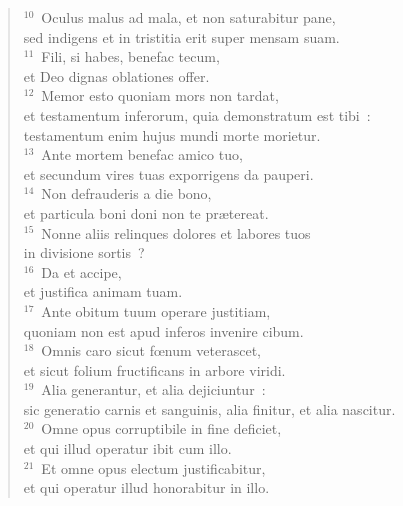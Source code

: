 \begin{flushleft}
\begin{verse}
${}^{10}$~Oculus malus ad mala, et non saturabitur pane,\\ sed indigens et in tristitia erit super mensam suam.\\
${}^{11}$~Fili, si habes, benefac tecum,\\ et Deo dignas oblationes offer.\\
${}^{12}$~Memor esto quoniam mors non tardat,\\ et testamentum inferorum, quia demonstratum est tibi~:\\ testamentum enim hujus mundi morte morietur.\\
${}^{13}$~Ante mortem benefac amico tuo,\\ et secundum vires tuas exporrigens da pauperi.\\
${}^{14}$~Non defrauderis a die bono,\\ et particula boni doni non te pr\ae tereat.\\
${}^{15}$~Nonne aliis relinques dolores et labores tuos\\ in divisione sortis~?\\
${}^{16}$~Da et accipe,\\ et justifica animam tuam.\\
${}^{17}$~Ante obitum tuum operare justitiam,\\ quoniam non est apud inferos invenire cibum.\\
${}^{18}$~Omnis caro sicut fœnum veterascet,\\ et sicut folium fructificans in arbore viridi.\\
${}^{19}$~Alia generantur, et alia dejiciuntur~:\\ sic generatio carnis et sanguinis, alia finitur, et alia nascitur.\\
${}^{20}$~Omne opus corruptibile in fine deficiet,\\ et qui illud operatur ibit cum illo.\\
${}^{21}$~Et omne opus electum justificabitur,\\ et qui operatur illud honorabitur in illo.\end{verse}\end{flushleft}


